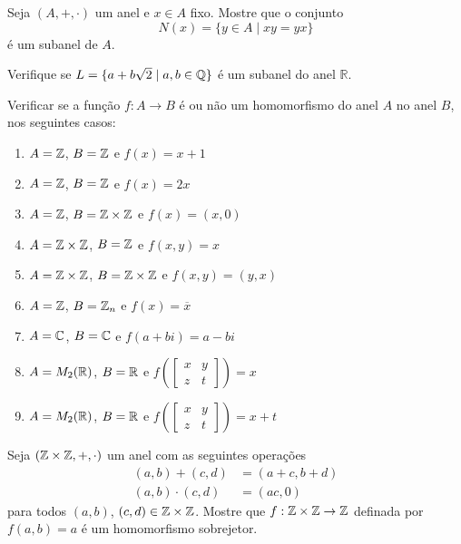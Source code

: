 \documentclass[12pt]{exam}
\begin{document}
\questao{} Seja $(A, + , \cdot)$ um anel e $x \in A$ fixo. Mostre que o conjunto
\[
	N(x) = \{y \in A \mid xy = yx\}
\]
\'e um subanel de $A$.

\vspace{.3cm}

\questao{} Verifique se $L = \{ a + b\sqrt{2} \mid a, b \in \mathbb{Q}\}$ {\'e} um subanel
do anel $\mathbb{R}$.

\vspace{.3cm}

 Verificar se a fun\c{c}\~ao $f : A \to B$ \'e ou n\~ao um homomorfismo do anel $A$ no anel $B$, nos seguintes casos:
\begin{enumerate}[label=({\alph*})]
\item $A = \mathbb{Z}$, $B = \mathbb{Z}$ e $f(x) = x + 1$
\item $A = \mathbb{Z}$, $B = \mathbb{Z}$ e $f(x) = 2x$
\item $A = \mathbb{Z}$, $B = \mathbb{Z} \times \mathbb{Z}$ e $f(x) = (x, 0)$
\item $A = \mathbb{Z} \times \mathbb{Z}$, $B = \mathbb{Z}$ e $f(x,y) = x$
\item $A = \mathbb{Z} \times \mathbb{Z}$, $B = \mathbb{Z} \times \mathbb{Z}$ e $f(x,y) = (y,x)$
\item $A = \mathbb{Z}$, $B = \mathbb{Z}_n$ e $f(x) = \overline{x}$
\item $A = \mathbb{C}$, $B = \mathbb{C}$ e $f(a + bi) = a - bi$
\item $A = M_2(\mathbb{R})$, $B = \mathbb{R}$ e $f\left(\begin{bmatrix}
	x & y\\z & t
\end{bmatrix}\right) = x$
\item $A = M_2(\mathbb{R})$, $B = \mathbb{R}$ e $f\left(\begin{bmatrix}
	x & y\\z & t
\end{bmatrix}\right) = x + t$
\end{enumerate}

\vspace{.3cm}

\questao{} Seja $(\mathbb{Z}\times\mathbb{Z}, +, \cdot)$ um anel com as seguintes opera\c{c}\~oes
\begin{align*}
	(a, b) + (c, d) &= (a + c, b + d)\\
	(a, b)\cdot (c, d) &= (ac, 0)
\end{align*}
para todos $(a, b)$, $(c, d) \in \mathbb{Z}\times\mathbb{Z}$.
Mostre que $ f : \mathbb{Z}\times\mathbb{Z} \to \mathbb{Z}$ definada por $f(a, b) = a$ \'e um homomorfismo sobrejetor.

\vspace{.3cm}
\end{document}
